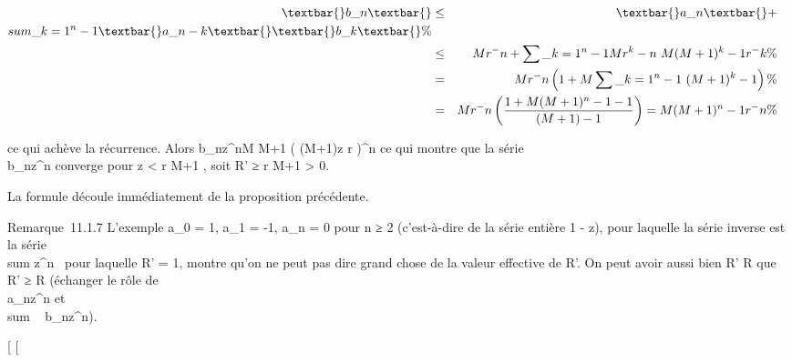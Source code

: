 \documentclass[]{article}
\begin{document}
\begin{align*} \textbar{}b\_n\textbar{}&
\leq& \textbar{}a\_n\textbar{} + \\sum
\_k=1^n-1\textbar{}a\_
n-k\textbar{}\textbar{}b\_k\textbar{} \%&
\\ & \leq& Mr^-n +
\sum \_k=1^n-1Mr^k-n~M(M
+ 1)^k-1r^-k \%& \\
& =& Mr^-n\left (1 +
M\sum \_k=1^n-1~(M +
1)^k-1\right ) \%&
\\ & =&
Mr^-n\left (1 + M (M + 1)^n-1 - 1
\over (M + 1) - 1 \right ) = M(M +
1)^n-1r^-n\%& \\
\end{align*}

ce qui achève la récurrence. Alors
\textbar{}b\_nz^n\textbar{}\leq M \over
M+1 \left ( (M+1)\textbar{}z\textbar{}
\over r \right )^n ce qui
montre que la série \\\sum
 b\_nz^n converge pour \textbar{}z\textbar{}
\textless{} r \over M+1 , soit R' ≥ r
\over M+1 \textgreater{} 0.

La formule découle immédiatement de la proposition précédente.

Remarque~11.1.7 L'exemple a\_0 = 1, a\_1 = -1,
a\_n = 0 pour n ≥ 2 (c'est-à-dire de la série entière 1 - z),
pour laquelle la série inverse est la série
\\sum  z^n~
pour laquelle R' = 1, montre qu'on ne peut pas dire grand chose de la
valeur effective de R'. On peut avoir aussi bien R' \leq R que R' ≥ R
(échanger le rôle de \\\sum
 a\_nz^n et
\\sum ~
b\_nz^n).

{[}
{[}
\end{document}
